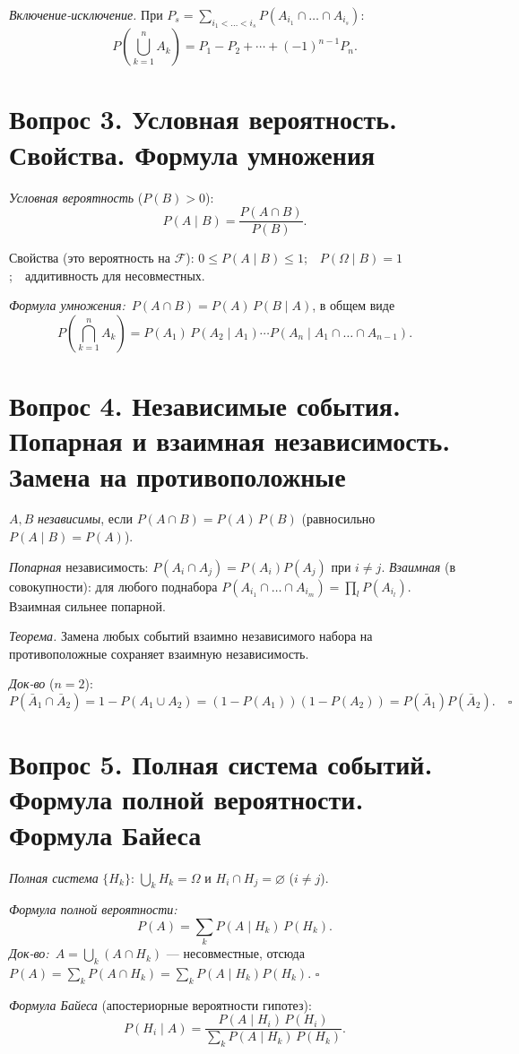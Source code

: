 \textit{Включение-исключение.} При $P_s=\sum_{i_1<\dots<i_s}P(A_{i_1}\cap\dots\cap A_{i_s})$:
\[ P\!\left(\bigcup_{k=1}^{n}A_k\right)=P_1-P_2+\cdots+(-1)^{n-1}P_n. \]

\section*{Вопрос 3. Условная вероятность. Свойства. Формула умножения}

\textit{Условная вероятность} ($P(B)>0$):
\[ P(A\mid B)=\frac{P(A\cap B)}{P(B)}. \]

Свойства (это вероятность на $\mathcal{F}$): $0\le P(A\mid B)\le1$;\ \ $P(\Omega\mid B)=1$;\ \ аддитивность для несовместных.

\textit{Формула умножения:}\ $P(A\cap B)=P(A)\,P(B\mid A)$, в общем виде
\[ P\!\left(\bigcap_{k=1}^{n}A_k\right)=P(A_1)\,P(A_2\mid A_1)\cdots P(A_n\mid A_1\cap\dots\cap A_{n-1}). \]

\section*{Вопрос 4. Независимые события. Попарная и взаимная независимость. Замена на противоположные}

$A,B$ \textit{независимы}, если $P(A\cap B)=P(A)\,P(B)$ (равносильно $P(A\mid B)=P(A)$).

\textit{Попарная} независимость: $P(A_i\cap A_j)=P(A_i)P(A_j)$ при $i\ne j$.
\textit{Взаимная} (в совокупности): для любого поднабора $P(A_{i_1}\cap\dots\cap A_{i_m})=\prod_{l}P(A_{i_l})$. Взаимная сильнее попарной.

\textit{Теорема.} Замена любых событий взаимно независимого набора на противоположные сохраняет взаимную независимость.

\textit{Док-во} ($n=2$):
\[ P(\bar A_1\cap\bar A_2)=1-P(A_1\cup A_2)=(1-P(A_1))(1-P(A_2))=P(\bar A_1)P(\bar A_2). \quad\square \]

\section*{Вопрос 5. Полная система событий. Формула полной вероятности. Формула Байеса}

\textit{Полная система} $\{H_k\}$: $\bigcup_k H_k=\Omega$ и $H_i\cap H_j=\varnothing$ ($i\ne j$).

\textit{Формула полной вероятности:}
\[ P(A)=\sum_k P(A\mid H_k)\,P(H_k). \]
\textit{Док-во:}\ $A=\bigcup_k(A\cap H_k)$ — несовместные, отсюда $P(A)=\sum_k P(A\cap H_k)=\sum_k P(A\mid H_k)P(H_k)$. \hfill$\square$

\textit{Формула Байеса} (апостериорные вероятности гипотез):
\[ P(H_i\mid A)=\frac{P(A\mid H_i)\,P(H_i)}{\sum_k P(A\mid H_k)\,P(H_k)}. \]
